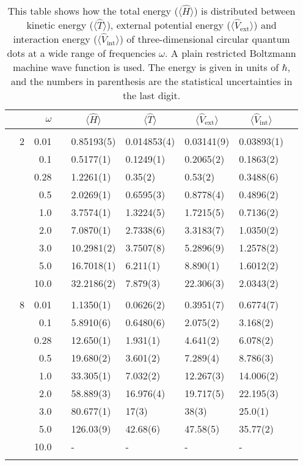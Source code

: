\begin{table}[H]
	\caption{This table shows how the total energy ($\langle\hat{H}\rangle$) is distributed between kinetic energy ($\langle\hat{T}\rangle$), external potential energy ($\langle\hat{V}_{\text{ext}}\rangle$) and interaction energy ($\langle\hat{V}_{\text{int}}\rangle$) of three-dimensional circular quantum dots at a wide range of frequencies $\omega$. A plain restricted Boltzmann machine wave function is used. The energy is given in units of $\hbar$, and the numbers in parenthesis are the statistical uncertainties in the last digit.}
	\label{tab:splitfrequencyQDRBM3D}
	\begin{tabularx}{\textwidth}{R{1cm}rrcR{2.3cm}R{2.3cm}R{2.3cm}R{2.3cm}R{1cm}} \hline\hline
		&\makecell{\\ \phantom{$N$} \\ \phantom{=}} & $\omega$ &&  &  &  &  & \\ \hline \\
		&2 & 0.01 && 0.85193(5) & 0.014853(4) & 0.03141(9) & 0.03893(1) \\
		&& 0.1 && 0.5177(1) & 0.1249(1) & 0.2065(2) & 0.1863(2) \\
		&& 0.28 && 1.2261(1) & 0.35(2) & 0.53(2) & 0.3488(6) \\
		&& 0.5 && 2.0269(1) & 0.6595(3) & 0.8778(4) & 0.4896(2) \\
		&& 1.0 && 3.7574(1) & 1.3224(5) & 1.7215(5) & 0.7136(2) \\
		&& 2.0 && 7.0870(1) & 2.7338(6) & 3.3183(7) & 1.0350(2) \\
		&& 3.0 && 10.2981(2) & 3.7507(8) & 5.2896(9) & 1.2578(2) \\ 
		&& 5.0 && 16.7018(1) & 6.211(1) & 8.890(1) & 1.6012(2) \\
		&& 10.0 && 32.2186(2) & 7.879(3) & 22.306(3) & 2.0343(2) \\
		\hdashline \\
		
		&8 & 0.01 && 1.1350(1) & 0.0626(2) & 0.3951(7) & 0.6774(7) \\
		&& 0.1 && 5.8910(6) & 0.6480(6) & 2.075(2) & 3.168(2) \\
		&& 0.28 && 12.650(1) & 1.931(1) & 4.641(2) & 6.078(2) \\
		&& 0.5 && 19.680(2) & 3.601(2) & 7.289(4) & 8.786(3) \\
		&& 1.0 && 33.305(1) & 7.032(2) & 12.267(3) & 14.006(2) \\
		&& 2.0 && 58.889(3) & 16.976(4) & 19.717(5) & 22.195(3) \\
		&& 3.0 && 80.677(1) & 17(3) & 38(3) & 25.0(1) \\ 
		&& 5.0 && 126.03(9) & 42.68(6) & 47.58(5) & 35.77(2) \\
		&& 10.0 && - & - & - & -\\
		\hdashline \\
		

\end{tabularx}
\end{table}
